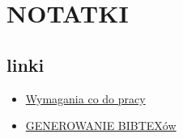 \section{NOTATKI}
\subsection{linki}
\begin{itemize}
    \item \href{https://uam.sharepoint.com/sites/4204000000/SitePages/Dyplomowanie-na-kierunku-Matematyka.aspx}{Wymagania co do pracy}
    \item \href{https://truben.no/latex/bibtex/}{GENEROWANIE BIBTEXów}
\end{itemize}